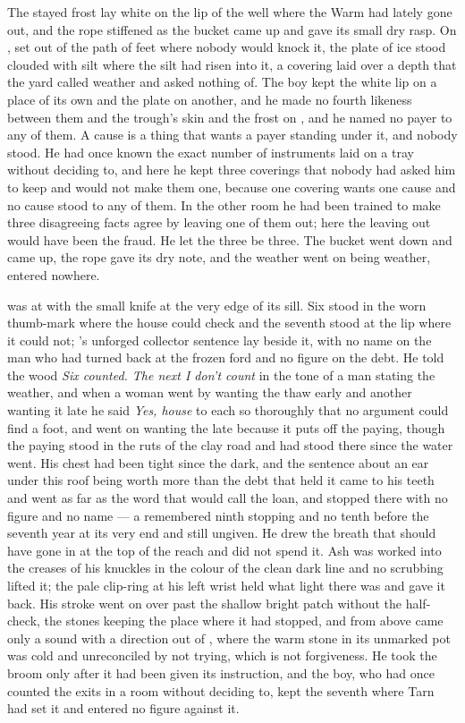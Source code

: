 The stayed frost lay white on the lip of the well where the Warm had lately gone out, and the rope stiffened as the bucket came up and gave its small dry rasp. On , set out of the path of feet where nobody would knock it, the plate of ice stood clouded with silt where the silt had risen into it, a covering laid over a depth that the yard called weather and asked nothing of. The boy kept the white lip on a place of its own and the plate on another, and he made no fourth likeness between them and the trough's skin and the frost on , and he named no payer to any of them. A cause is a thing that wants a payer standing under it, and nobody stood. He had once known the exact number of instruments laid on a tray without deciding to, and here he kept three coverings that nobody had asked him to keep and would not make them one, because one covering wants one cause and no cause stood to any of them. In the other room he had been trained to make three disagreeing facts agree by leaving one of them out; here the leaving out would have been the fraud. He let the three be three. The bucket went down and came up, the rope gave its dry note, and the weather went on being weather, entered nowhere.

\scenebreak

 was at  with the small knife at the very edge of its sill. Six stood in the worn thumb-mark where the house could check and the seventh stood at the lip where it could not; 's unforged collector sentence lay beside it, with no name on the man who had turned back at the frozen ford and no figure on the debt. He told the wood \emph{Six counted. The next I don't count} in the tone of a man stating the weather, and when a woman went by wanting the thaw early and another wanting it late he said \emph{Yes, house} to each so thoroughly that no argument could find a foot, and went on wanting the late because it puts off the paying, though the paying stood in the ruts of the clay road and had stood there since the water went. His chest had been tight since the dark, and the sentence about an ear under this roof being worth more than the debt that held it came to his teeth and went as far as the word that would call the loan, and stopped there with no figure and no name --- a remembered ninth stopping and no tenth before the seventh year at its very end and still ungiven. He drew the breath that should have gone in at the top of the reach and did not spend it. Ash was worked into the creases of his knuckles in the colour of the clean dark line and no scrubbing lifted it; the pale clip-ring at his left wrist held what light there was and gave it back. His stroke went on over  past the shallow bright patch without the half-check, the stones keeping the place where it had stopped, and from above came only a sound with a direction out of , where the warm stone in its unmarked pot was cold and unreconciled by not trying, which is not forgiveness. He took the broom only after it had been given its instruction, and the boy, who had once counted the exits in a room without deciding to, kept the seventh where Tarn had set it and entered no figure against it.

